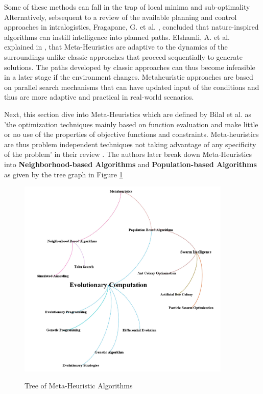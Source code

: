 Some of these methods can fall in the trap of local minima and sub-optimality \cite{R12}
Alternatively, sebsequent to a review of the available planning and control approaches in intralogistics, Fragapane, G. et al. \cite{R7}, 
concluded that nature-inspired algorithms can instill intelligence into planned paths.
Elshamli, A. et al. explained in \cite{R17}, that Meta-Heuristics are adaptive to the dynamics of the surroundings
unlike classic approaches that proceed sequentially to generate solutions. The paths developed by classic approaches
can thus become infeasible in a later stage if the environment changes. Metaheuristic approaches are based 
on parallel search mechanisms that can have updated input of the conditions and thus are more adaptive and 
practical in real-world scenarios.

Next, this section dive into Meta-Heuristics which are defined by Bilal et al. as 'the optimization
techniques mainly based on function evaluation and make little
or no use of the properties of objective functions and constraints.
Meta-heuristics are thus problem independent techniques not taking
advantage of any specificity of the problem’ in their review \cite{R37}.
The authors later break down Meta-Heuristics into \textbf{Neighborhood-based Algorithms} and \textbf{Population-based Algorithms}
as given by the tree graph in Figure \ref{Tree}

\begin{figure}[H]
    \begin{center}
        \includegraphics[width=4in]{images/Chap1/Tree_Metaheuristic.png}\\
        \caption{Tree of Meta-Heuristic Algorithms \cite{R37}}
        \label{Tree}
    \end{center}
\end{figure}


